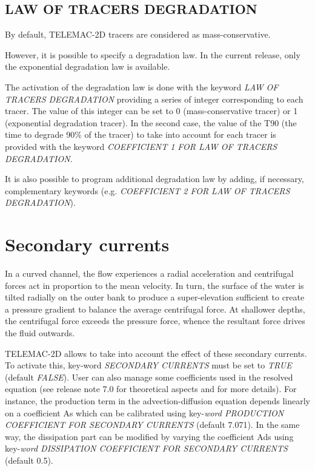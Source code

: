\documentclass{article} %
\begin{document}
\subsection{ LAW OF TRACERS DEGRADATION}

 By default, TELEMAC-2D tracers are considered as mass-conservative.

 However, it is possible to specify a degradation law. In the current release, only the exponential degradation law is available.

 The activation of the degradation law is done with the keyword \textit{LAW OF TRACERS DEGRADATION} providing a series of integer corresponding to each tracer. The value of this integer can be set to 0 (mass-conservative tracer) or 1 (exponential degradation tracer). In the second case, the value of the T90 (the time to degrade 90\% of the tracer) to take into account for each tracer is provided with the keyword \textit{COEFFICIENT 1 FOR LAW OF TRACERS DEGRADATION.}

 It is also possible to program additional degradation law by adding, if necessary, complementary keywords (e.g. \textit{COEFFICIENT 2 FOR LAW OF TRACERS DEGRADATION}).




\section{ Secondary currents}

 In a curved channel, the flow experiences a radial acceleration and centrifugal forces act in proportion to the mean velocity.  In turn, the surface of the water is tilted radially on the outer bank to produce a super-elevation sufficient to create a pressure gradient to balance the average centrifugal force.  At shallower depths, the centrifugal force exceeds the pressure force, whence the resultant force drives the fluid outwards.

 TELEMAC-2D allows to take into account the effect of these secondary currents. To activate this, key-word \textit{SECONDARY CURRENTS} must be set to \textit{TRUE} (default \textit{FALSE}).  User can also manage some coefficients used in the resolved equation (see release note 7.0 for theoretical aspects and for more details). For instance, the production term in the advection-diffusion equation depends linearly on a coefficient As which can be calibrated using key-\textit{word PRODUCTION COEFFICIENT FOR SECONDARY CURRENTS} (default 7.071).  In the same way, the dissipation part can be modified by varying the coefficient Ads using key-\textit{word DISSIPATION COEFFICIENT FOR SECONDARY CURRENTS} (default 0.5).
\end{document}
